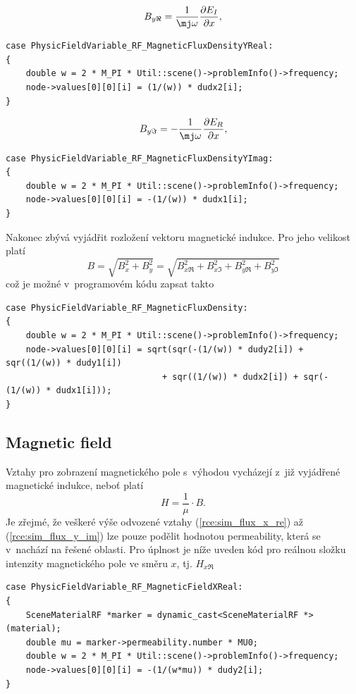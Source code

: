 \begin{equation}
	B_{y\Re} = \frac{1}{\mj\omega}\frac{\partial E_I}{\partial x},
	\label{rce:sim_flux_y_re}
\end{equation}
\begin{verbatim}
case PhysicFieldVariable_RF_MagneticFluxDensityYReal:
{
    double w = 2 * M_PI * Util::scene()->problemInfo()->frequency;
    node->values[0][0][i] = (1/(w)) * dudx2[i];
}
\end{verbatim}
\begin{equation}
	B_{y\Im} = -\frac{1}{\mj\omega}\frac{\partial E_R}{\partial x},
	\label{rce:sim_flux_y_im}
\end{equation}
\begin{verbatim}
case PhysicFieldVariable_RF_MagneticFluxDensityYImag:
{
    double w = 2 * M_PI * Util::scene()->problemInfo()->frequency;
    node->values[0][0][i] = -(1/(w)) * dudx1[i];
}
\end{verbatim}
Nakonec zbývá vyjádřit rozložení vektoru magnetické indukce. Pro jeho velikost platí
\begin{displaymath}
	B = \sqrt{B_{x}^{2} + B_{y}^{2}} = \sqrt{B_{x\Re}^{2} + B_{x\Im}^{2} + B_{y\Re}^{2} + B_{y\Im}^{2}}
\end{displaymath}
což je možné v~programovém kódu zapsat takto
\begin{verbatim}
case PhysicFieldVariable_RF_MagneticFluxDensity:
{
    double w = 2 * M_PI * Util::scene()->problemInfo()->frequency;
    node->values[0][0][i] = sqrt(sqr(-(1/(w)) * dudy2[i]) + sqr((1/(w)) * dudy1[i])
                               + sqr((1/(w)) * dudx2[i]) + sqr(-(1/(w)) * dudx1[i]));
}
\end{verbatim}

\subsection*{Magnetic field}
Vztahy pro zobrazení magnetického pole s~výhodou vycházejí z~již vyjádřené magnetické indukce, neboť platí
\begin{displaymath}
H = \frac{1}{\mu}\cdot B.
\end{displaymath}
Je zřejmé, že veškeré výše odvozené vztahy (\ref{rce:sim_flux_x_re}) až (\ref{rce:sim_flux_y_im}) lze pouze podělit hodnotou permeability, která se v~nachází na řešené oblasti. Pro úplnost je níže uveden kód pro reálnou složku intenzity magnetického pole ve směru $x$, tj. $H_{x\Re}$
\begin{verbatim}
case PhysicFieldVariable_RF_MagneticFieldXReal:
{
    SceneMaterialRF *marker = dynamic_cast<SceneMaterialRF *>(material);
    double mu = marker->permeability.number * MU0;
    double w = 2 * M_PI * Util::scene()->problemInfo()->frequency;
    node->values[0][0][i] = -(1/(w*mu)) * dudy2[i];
}
\end{verbatim}

